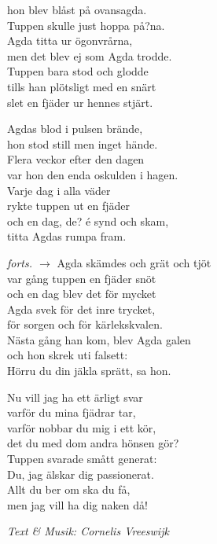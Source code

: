 hon blev blåst på ovansagda.\\
Tuppen skulle just hoppa på?na.\\
Agda titta ur ögonvrårna,\\
men det blev ej som Agda trodde.\\
Tuppen bara stod och glodde\\
tills han plötsligt med en snärt\\
slet en fjäder ur hennes stjärt.\par
\vspace{10pt}
Agdas blod i pulsen brände,\\
hon stod still men inget hände.\\
Flera veckor efter den dagen\\
var hon den enda oskulden i hagen.\\
Varje dag i alla väder\\
rykte tuppen ut en fjäder\\
och en dag, de? é synd och skam,\\
titta Agdas rumpa fram.\par
\vfill
\hfill {\footnotesize\textit{forts. $\rightarrow$}}
\newpage
Agda skämdes och grät och tjöt\\
var gång tuppen en fjäder snöt\\
och en dag blev det för mycket\\
Agda svek för det inre trycket,\\
för sorgen och för kärlekskvalen.\\
Nästa gång han kom, blev Agda galen\\
och hon skrek uti falsett:\\
Hörru du din jäkla sprätt, sa hon.\par
\vspace{10pt}
Nu vill jag ha ett ärligt svar\\
varför du mina fjädrar tar,\\
varför nobbar du mig i ett kör,\\
det du med dom andra hönsen gör?\\
Tuppen svarade smått generat:\\
Du, jag älskar dig passionerat.\\
Allt du ber om ska du få,\\
men jag vill ha dig naken då!\par
\vspace{10pt}
{\footnotesize\textit{Text \& Musik: Cornelis Vreeswijk}}
